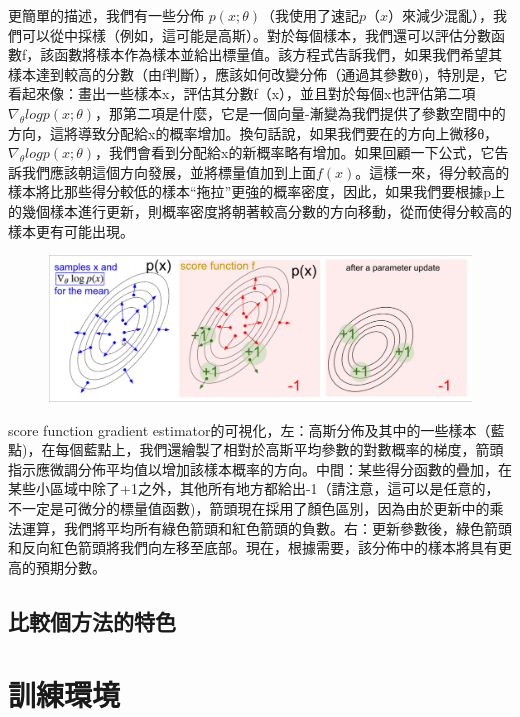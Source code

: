 \documentclass[14pt,a4paper]{report}  %
\begin{document}
更簡單的描述，我們有一些分佈 $p(x;\theta)$（我使用了速記$ p（x）$來減少混亂），我們可以從中採樣（例如，這可能是高斯）。對於每個樣本，我們還可以評估分數函數f，該函數將樣本作為樣本並給出標量值。該方程式告訴我們，如果我們希望其樣本達到較高的分數（由f判斷），應該如何改變分佈（通過其參數θ)，特別是，它看起來像：畫出一些樣本x，評估其分數f（x），並且對於每個x也評估第二項 $\nabla_\theta logp(x;θ)$，那第二項是什麼，它是一個向量-漸變為我們提供了參數空間中的方向，這將導致分配給x的概率增加。換句話說，如果我們要在的方向上微移θ，$\nabla_\theta logp(x;θ)$，我們會看到分配給x的新概率略有增加。如果回顧一下公式，它告訴我們應該朝這個方向發展，並將標量值加到上面$f(x)$。這樣一來，得分較高的樣本將比那些得分較低的樣本“拖拉”更強的概率密度，因此，如果我們要根據p上的幾個樣本進行更新，則概率密度將朝著較高分數的方向移動，從而使得分較高的樣本更有可能出現。\\
\begin{figure}[hbt!]
\begin{center}
\includegraphics[scale=0.4]{figure}
\end{center}
\end{figure}
\qquad score function gradient estimator的可視化，左：高斯分佈及其中的一些樣本（藍點)，在每個藍點上，我們還繪製了相對於高斯平均參數的對數概率的梯度，箭頭指示應微調分佈平均值以增加該樣本概率的方向。中間：某些得分函數的疊加，在某些小區域中除了+1之外，其他所有地方都給出-1（請注意，這可以是任意的，不一定是可微分的標量值函數)，箭頭現在採用了顏色區別，因為由於更新中的乘法運算，我們將平均所有綠色箭頭和紅色箭頭的負數。右：更新參數後，綠色箭頭和反向紅色箭頭將我們向左移至底部。現在，根據需要，該分佈中的樣本將具有更高的預期分數。\\
\newpage
\section{比較個方法的特色}
\chapter{訓練環境}
\end{document}
